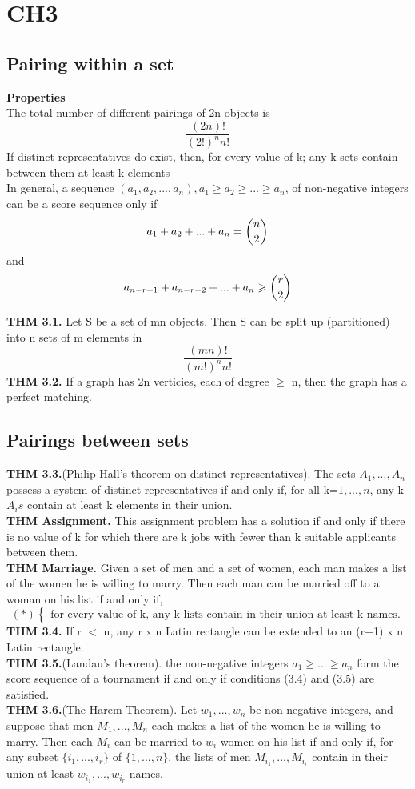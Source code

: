 \documentclass[12pt]{article}
\begin{document}
	\section{CH3}
	\subsection{Pairing within a set}
	\textbf{Properties} \\
	 The total number of different pairings of 2n objects is \[ \dfrac{(2n)!}{(2!)^nn!} \] 
	 If distinct representatives do exist, then, for every value of k; any k sets contain between them at least k elements \\
	In general, a sequence $(a_1,a_2,...,a_n),a_1 \geqslant a_2 \geqslant ... \geqslant a_n$, of non-negative integers can be a score sequence only if  \\
	\[ a_1 + a_2 + ... + a_n = \dbinom{n}{2} \] 
	and 
	 \[ a_{n-r+1} + a_{n-r+2} + ... + a_n \geqslant \dbinom{r}{2}   \]
	
	
	\textbf{THM 3.1.} Let S be a set of mn objects. Then S can be split up (partitioned) into n sets of m elements in 
	\[ \dfrac{(mn)!}{(m!)^nn!} \] 
	\textbf{THM 3.2.} If a graph has 2n verticies, each of degree $\geqslant$ n, then the graph has a perfect matching.
	\subsection{Pairings between sets}
	\textbf{THM 3.3.}(Philip Hall's theorem on distinct representatives). The sets $A_1,...,A_n$ possess a system of distinct representatives if and only if, for all k=$1,...,n$, any k $A_is$ contain at least k elements in their union.  \\
	\textbf{THM Assignment.} This assignment problem has a solution if and only if there is no value of k for which there are k jobs with fewer than k suitable applicants between them.		\\
	\textbf{THM Marriage.} Given a set of men and a set of women, each man makes a list of the women he is willing to marry. Then each man can be married off to a woman on his list if and only if, 
	\[ 
	(*)
	\begin{cases} 
	\text{for every value of k, any k lists contain in their union at least k names.}
	\end{cases}
	\]
	\textbf{THM 3.4.} If r $<$ n, any r x n Latin rectangle can be extended to an (r+1) x n Latin rectangle. \\
	\textbf{THM 3.5.}(Landau's theorem). the non-negative integers $a_1 \geqslant ... \geqslant a_n$ form the score sequence of a tournament if and only if conditions (3.4) and (3.5) are satisfied.  \\
	\textbf{THM 3.6.}(The Harem Theorem). Let $w_1,...,w_n$ be non-negative integers, and suppose that men $M_1,...,M_n$ each makes a list of the women he is willing to marry. Then each $M_i$ can be married to $w_i$ women on his list if and only if, for any subset $\{i_1,...,i_r\}$ of $\{ 1,...,n \}$, the lists of men $M_{i_1}, ..., M_{i_r}$ contain in their union at least $w_{i_1}, ..., w_{i_r}$ names. \\
	
\end{document}
